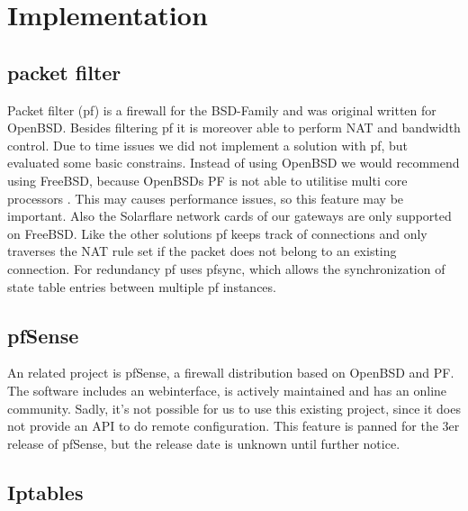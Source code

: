 \documentclass{report}
\begin{document}
\chapter{Implementation}\label{implementation}

\section{packet filter}\label{packet-filter}

Packet filter (pf)\cite{pf}\cite{pfOpenBSD} is a firewall for the BSD-Family and was
original written for OpenBSD. Besides filtering pf it is moreover able to perform NAT
and bandwidth control. Due to time issues we did not implement a
solution with pf, but evaluated some basic constrains. Instead of using
OpenBSD we would recommend using FreeBSD, because OpenBSDs PF is not able to
utilitise multi core processors \cite{pfOpenBSDperf}. This may causes performance issues,
so this feature may be important. Also the Solarflare network cards of our gateways are
only supported on FreeBSD. Like the other solutions pf keeps track of
connections and only traverses the NAT rule set if the packet does not
belong to an existing connection. For redundancy pf uses pfsync\cite{pfsync},
which allows the synchronization of state table entries between
multiple pf instances.

\section{pfSense}\label{pfsense}

An related project is pfSense\cite{pfsense}, a firewall distribution based on
OpenBSD and PF. The software includes an webinterface, is actively
maintained and has an online community. Sadly, it's not possible for us
to use this existing project, since it does not provide an API to do
remote configuration. This feature is panned for the 3er release of
pfSense, but the release date is unknown until further notice.


\section{Iptables}\label{iptables}
\end{document}
